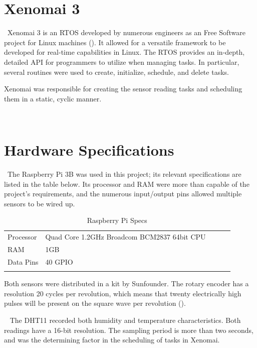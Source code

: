\documentclass[letterpaper, 12pt]{article}
\begin{document}
\section{Xenomai 3}
~\indent Xenomai 3 is an RTOS developed by numerous engineers as an Free Software project for Linux machines (\cite{xenomai2018}).  It allowed for a versatile framework to be developed for real-time capabilities in Linux.  The RTOS provides an in-depth, detailed API for programmers to utilize when managing tasks.  In particular, several routines were used to create, initialize, schedule, and delete tasks.

\indent Xenomai was responsible for creating the sensor reading tasks and scheduling them in a static, cyclic manner. 

~\newpage
\section{Hardware Specifications}
~\indent The Raspberry Pi 3B was used in this project; its relevant specifications are listed in the table below.  Its processor and RAM were more than capable of the project's requirements, and the numerous input/output pins allowed multiple sensors to be wired up.
~\newline
\begin{table}[hbt]
	\centering
	\caption{Raspberry Pi Specs}
	\label{my-label}
	\begin{tabular}{lllll}
		\cline{1-2}
		\multicolumn{1}{|l|}{Processor} & \multicolumn{1}{l|}{Quad Core 1.2GHz Broadcom BCM2837 64bit CPU} &  &  &  \\ \cline{1-2}
		\multicolumn{1}{|l|}{RAM} & \multicolumn{1}{l|}{1GB} &  &  &  \\ \cline{1-2}
		\multicolumn{1}{|l|}{Data Pins} & \multicolumn{1}{l|}{40 GPIO} &  &  &  \\ \cline{1-2}
		&                       &  &  & 
	\end{tabular}
\end{table}

Both sensors were distributed in a kit by Sunfounder.  The rotary encoder has a resolution 20 cycles per revolution, which means that twenty electrically high pulses will be present on the square wave per revolution (\cite{artofcircuits2018}).  

~\newline
\indent The DHT11 recorded both humidity and temperature characteristics.  Both readings have a 16-bit resolution.  The sampling period is more than two seconds, and was the determining factor in the scheduling of tasks in Xenomai.
\end{document}
